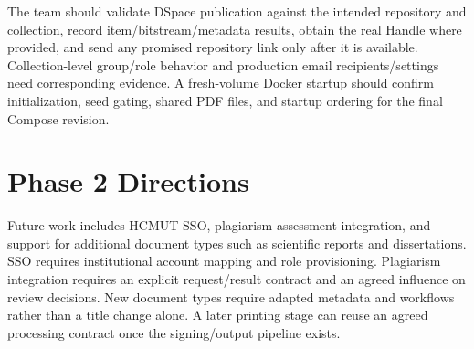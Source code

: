 \documentclass[11pt,a4paper]{report}
\begin{document}
The team should validate DSpace publication against the intended repository and collection, record item/bitstream/metadata results, obtain the real Handle where provided, and send any promised repository link only after it is available. Collection-level group/role behavior and production email recipients/settings need corresponding evidence. A fresh-volume Docker startup should confirm initialization, seed gating, shared PDF files, and startup ordering for the final Compose revision.

\section{Phase 2 Directions}
Future work includes HCMUT SSO, plagiarism-assessment integration, and support for additional document types such as scientific reports and dissertations. SSO requires institutional account mapping and role provisioning. Plagiarism integration requires an explicit request/result contract and an agreed influence on review decisions. New document types require adapted metadata and workflows rather than a title change alone. A later printing stage can reuse an agreed processing contract once the signing/output pipeline exists.
\end{document}
